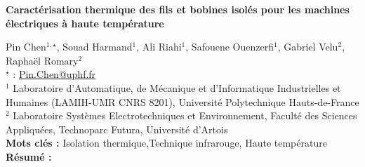 


    \newpage


%
\begin{flushleft}
\addtocounter{section}{1}
{\Large \textbf{Caractérisation thermique des fils et bobines isolés pour les machines électriques à haute température}}\label{ref:51}
\end{flushleft}
%
Pin Chen$^{1,\star}$, Souad Harmand$^{1}$, Ali Riahi$^{1}$, Safouene Ouenzerfi$^{1}$, Gabriel Velu$^{2}$, Raphaël Romary$^{2}$\\[2mm]
$^{\star}$ \Letter : \url{Pin.Chen@uphf.fr}\\[2mm]
{\footnotesize $^{1}$ Laboratoire d'Automatique, de Mécanique et d'Informatique Industrielles et Humaines (LAMIH-UMR CNRS 8201), Université Polytechnique Hauts-de-France}\\
{\footnotesize $^{2}$ Laboratoire Systèmes Electrotechniques et Environnement, Faculté des Sciences Appliquées, Technoparc Futura, Université d'Artois}\\
[4mm]
%
\noindent \textbf{Mots clés : } Isolation thermique,Technique infrarouge, Haute température\\[4mm]
%
\noindent \textbf{Résumé : } 

